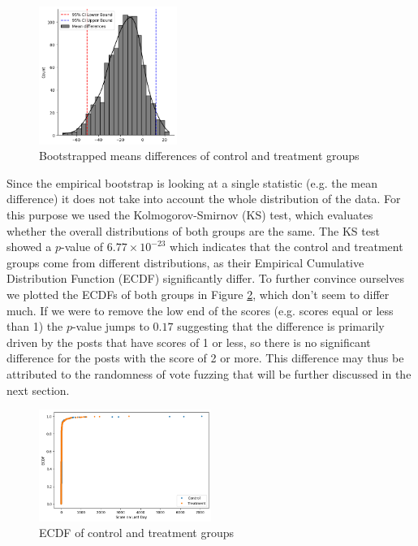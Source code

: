 \documentclass[fleqn,12pt]{article}
\begin{document}
\begin{figure}[h]
  \centering
  \includegraphics[width=0.4\textwidth]{figures/mean_difference.png}
  \caption{Bootstrapped means differences of control and treatment groups}
  \label{fig:mean_difference}
\end{figure}

Since the empirical bootstrap is looking at a single statistic (e.g. the mean difference)
it does not take into account the whole distribution of the data. For this
purpose we used the Kolmogorov-Smirnov (KS) test, which evaluates
whether the overall distributions of both groups are the same. 
The KS test showed a $p$-value of $6.77 \times 10^{-23}$ which indicates
that the control and treatment groups come from different distributions,
as their Empirical Cumulative Distribution Function (ECDF) significantly differ.
To further convince ourselves we plotted the ECDFs of both groups in Figure \ref{fig:ecdf}, which 
don't seem to differ much.
If we were to remove the low end of the scores (e.g. scores equal or less than 1) the $p$-value
jumps to $0.17$ suggesting that the difference is primarily 
driven by the posts that have scores of 1 or less, so there is no 
significant difference for the posts with the score of 2 or more.
This difference may thus be attributed to the randomness of vote fuzzing that will
be further discussed in the next section.

\begin{figure}[h]
  \centering
  \includegraphics[width=0.5\textwidth]{figures/ecdf.png}
  \caption{ECDF of control and treatment groups}
  \label{fig:ecdf}
\end{figure}
\end{document}
